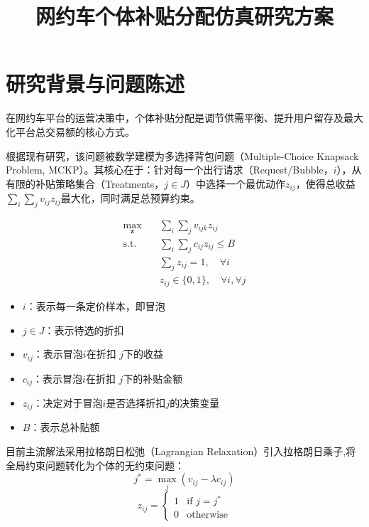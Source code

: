 \documentclass[12pt, a4paper]{article}
\title{\textbf{网约车个体补贴分配仿真研究方案}}
\begin{document}
\maketitle


\section{研究背景与问题陈述}
在网约车平台的运营决策中，个体补贴分配是调节供需平衡、提升用户留存及最大化平台总交易额的核心方式。

根据现有研究，该问题被数学建模为多选择背包问题（Multiple-Choice Knapsack Problem, MCKP）。其核心在于：针对每一个出行请求（Request/Bubble，$i$），从有限的补贴策略集合（Treatments，$j \in J$）中选择一个最优动作$z_{ij}$，使得总收益$\sum_i\sum_j v_{ij}z_{ij}$最大化，同时满足总预算约束。

\begin{equation} \label{eq:mckp}
\begin{aligned}
\max_{\bm{z}} \quad & \sum_{i} \sum_{j} v_{ijk} z_{ij} \\
\text{s.t.} \quad & \sum_{i}\sum_{j} c_{ij} z_{ij} \le B  \\
& \sum_{j} z_{ij} = 1, \quad \forall i \\
& z_{ij} \in \{0, 1\}, \quad\forall i,\forall j
\end{aligned}
\end{equation}
\begin{itemize}
    \item $i$：表示每一条定价样本，即冒泡
    \item $j \in J$：表示待选的折扣
    \item $v_{ij}$：表示冒泡$i$在折扣 $j$下的收益
    \item $c_{ij}$：表示冒泡$i$在折扣 $j$下的补贴金额
    \item $z_{ij}$：决定对于冒泡$i$是否选择折扣$j$的决策变量
    \item $B$：表示总补贴额
\end{itemize}

目前主流解法采用拉格朗日松弛（Lagrangian Relaxation）引入拉格朗日乘子,将全局约束问题转化为个体的无约束问题：
$$j^*=\max_j (v_{ij} - \lambda c_{ij})$$
$$z_{ij} = 
\begin{cases} 
1 & \text{if } j = j^*\\ 
0& \text{otherwise} 
\end{cases}$$
\end{document}

